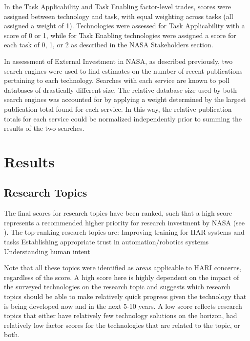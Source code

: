 In the Task Applicability and Task Enabling factor-level trades, scores were assigned between technology and task, with equal weighting across tasks (all assigned a weight of 1). Technologies were assessed for Task Applicability with a score of 0 or 1, while for Task Enabling technologies were assigned a score for each task of 0, 1, or 2 as described in the NASA Stakeholders section.

In assessment of External Investment in NASA, as described previously, two search engines were used to find estimates on the number of recent publications pertaining to each technology. Searches with each service are known to poll databases of drastically different size. The relative database size used by both search engines was accounted for by applying a weight determined by the largest publication total found for each service. In this way, the relative publication totals for each service could be normalized independently prior to summing the results of the two searches.

\section{Results}

\subsection{Research Topics}
The final scores for research topics have been ranked, such that a high score represents a recommended higher priority for research investment by NASA (see ). The top-ranking research topics are:
	Improving training for HAR systems and tasks
	Establishing appropriate trust in automation/robotics systems
	Understanding human intent

Note that all these topics were identified as areas applicable to HARI concerns, regardless of the score. A high score here is highly dependent on the impact of the surveyed technologies on the research topic and suggests which research topics should be able to make relatively quick progress given the technology that is being developed now and in the next 5-10 years. A low score reflects research topics that either have relatively few technology solutions on the horizon, had relatively low factor scores for the technologies that are related to the topic, or both.

